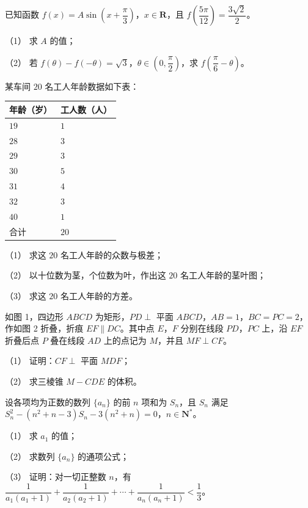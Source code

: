 \begin{question}
已知函数 $f(x)=A\sin\left(x+\dfrac\pi3\right)$，$x\in\mathbf R$，且 $f\left(\dfrac{5\pi}{12}\right)=\dfrac{3\sqrt2}{2}$。

（1） 求 $A$ 的值；

（2） 若 $f(\theta)-f(-\theta)=\sqrt3$，$\theta\in\left(0,\dfrac\pi2\right)$，求 $f\left(\dfrac\pi6-\theta\right)$。

\end{question}
\begin{question}
某车间 $20$ 名工人年龄数据如下表：

\begin{center}
\begin{tabular}{ll}
\toprule
年龄（岁） & 工人数（人） \\
\midrule
$19$ & $1$ \\
$28$ & $3$ \\
$29$ & $3$ \\
$30$ & $5$ \\
$31$ & $4$ \\
$32$ & $3$ \\
$40$ & $1$ \\
合计 & $20$ \\
\bottomrule
\end{tabular}
\end{center}

（1） 求这 $20$ 名工人年龄的众数与极差；

（2） 以十位数为茎，个位数为叶，作出这 $20$ 名工人年龄的茎叶图；

（3） 求这 $20$ 名工人年龄的方差。

\Needspace{0.4\textheight}
\end{question}
\begin{question}
如图 1，四边形 $ABCD$ 为矩形，$PD\perp$ 平面 $ABCD$，$AB=1$，$BC=PC=2$，作如图 2 折叠，折痕 $EF\parallel DC$。其中点 $E$，$F$ 分别在线段 $PD$，$PC$ 上，沿 $EF$ 折叠后点 $P$ 叠在线段 $AD$ 上的点记为 $M$，并且 $MF\perp CF$。
\nopagebreak[4]
\begin{center}\end{center}
\nopagebreak[4]
（1） 证明：$CF\perp$ 平面 $MDF$；

（2） 求三棱锥 $M-CDE$ 的体积。

\end{question}
\begin{question}
设各项均为正数的数列 $\{a_n\}$ 的前 $n$ 项和为 $S_n$，且 $S_n$ 满足 $S_n^2-(n^2+n-3)S_n-3(n^2+n)=0$，$n\in\mathbf N^*$。

（1） 求 $a_1$ 的值；

（2） 求数列 $\{a_n\}$ 的通项公式；

（3） 证明：对一切正整数 $n$，有 $\dfrac1{a_1(a_1+1)}+\dfrac1{a_2(a_2+1)}+\cdots+\dfrac1{a_n(a_n+1)}<\dfrac13$。

\end{question}
